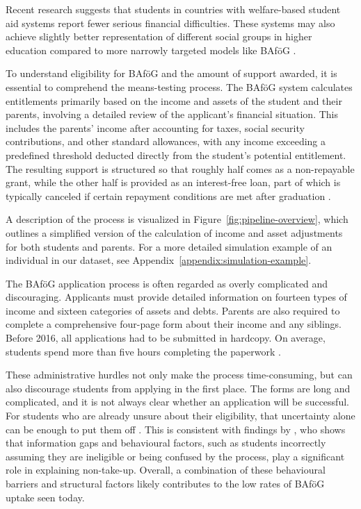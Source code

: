 Recent research suggests that students in countries with welfare-based student aid systems report fewer serious financial difficulties. These systems may also achieve slightly better representation of different social groups in higher education compared to more narrowly targeted models like BAföG  \citep{gwosc_krisenbewaltigung_2022}.

To understand eligibility for BAföG and the amount of support awarded, it is essential to comprehend the means-testing process. The BAföG system calculates entitlements primarily based on the income and assets of the student and their parents, involving a detailed review of the applicant’s financial situation. This includes the parents’ income after accounting for taxes, social security contributions, and other standard allowances, with any income exceeding a predefined threshold deducted directly from the student’s potential entitlement. The resulting support is structured so that roughly half comes as a non-repayable grant, while the other half is provided as an interest-free loan, part of which is typically canceled if certain repayment conditions are met after graduation \citep{herber_non-take-up_2019}.

A description of the process is visualized in Figure~\ref{fig:pipeline-overview}, which outlines a simplified version of the calculation of income and asset adjustments for both students and parents. For a more detailed simulation example of an individual in our dataset, see Appendix~\ref{appendix:simulation-example}.

The BAföG application process is often regarded as overly complicated and discouraging. Applicants must provide detailed information on fourteen types of income and sixteen categories of assets and debts. Parents are also required to complete a comprehensive four-page form about their income and any siblings. Before 2016, all applications had to be submitted in hardcopy. On average, students spend more than five hours completing the paperwork \citep{fidan_why_2021}.

These administrative hurdles not only make the process time-consuming, but can also discourage students from applying in the first place. 
The forms are long and complicated, and it is not always clear whether an application will be successful. 
For students who are already unsure about their eligibility, that uncertainty alone can be enough to put them off \citep{kroher_studierendenbefragung_2023}. 
This is consistent with findings by \cite{fidan_why_2021}, who shows that information gaps and behavioural factors, such as students incorrectly assuming they are ineligible or being confused by the process, play a significant role in explaining non-take-up.
Overall, a combination of these behavioural barriers and structural factors likely contributes to the low rates of BAföG uptake seen today. 

